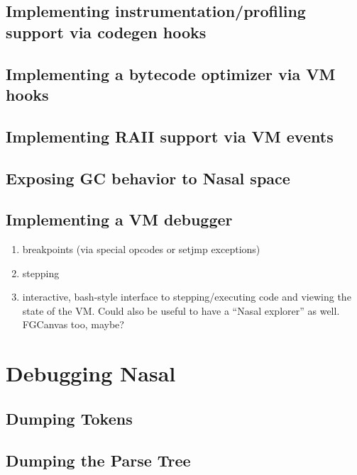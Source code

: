 \documentclass{article}
\newcommand{\todo}[1]{}
\newcommand{\comment}[1]{}%
\begin{document}
\subsection{Implementing instrumentation/profiling support via codegen hooks}
\subsection{Implementing a bytecode optimizer via VM hooks}

\subsection{Implementing RAII support via VM events}
\subsection{Exposing GC behavior to Nasal space}

\subsection{Implementing a VM debugger}
\begin{enumerate}
 \item breakpoints (via special opcodes or setjmp exceptions)
 \item stepping
 \item interactive, bash-style interface to stepping/executing code and viewing the state of the VM. Could also be useful to have a ``Nasal explorer'' as well. FGCanvas too, maybe?
\end{enumerate}




\section{Debugging Nasal}
\comment{document usage of gdb, valgrind and debugging libs here}
\todo{see various helpers in debug.c and contrib/int-nasal.c}
\subsection{Dumping Tokens}
\subsection{Dumping the Parse Tree}
\end{document}
